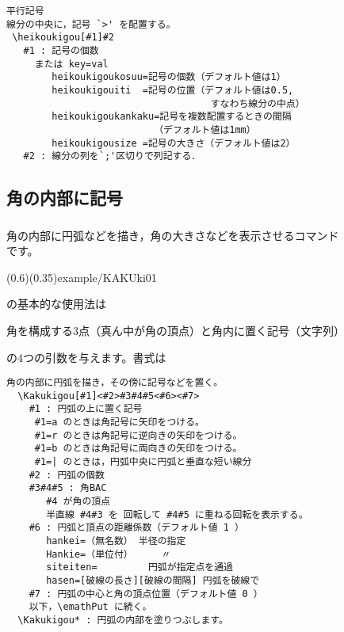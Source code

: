 \begin{boxnote}
\begin{verbatim}
平行記号
線分の中央に，記号 `>' を配置する。
 \heikoukigou[#1]#2
   #1 : 記号の個数
     または key=val
        heikoukigoukosuu=記号の個数（デフォルト値は1）
        heikoukigouiti  =記号の位置（デフォルト値は0.5, 
                                    すなわち線分の中点）
        heikoukigoukankaku=記号を複数配置するときの間隔
                          （デフォルト値は1mm）
        heikoukigousize =記号の大きさ（デフォルト値は2）
   #2 : 線分の列を`;'区切りで列記する．
\end{verbatim}
\end{boxnote}

\subsection{角の内部に記号}
\subsubsection{\texorpdfstring{}{Kakukigou}}
角の内部に円弧などを描き，角の大きさなどを表示させるコマンド\\
 です。

(0.6)(0.35){example/KAKUki01}

 の基本的な使用法は
\begin{jquote}
角を構成する3点（真ん中が角の頂点）と角内に置く記号（文字列）
\end{jquote}
の4つの引数を与えます。書式は

\begin{boxnote}
\begin{verbatim}
角の内部に円弧を描き，その傍に記号などを置く。
  \Kakukigou[#1]<#2>#3#4#5<#6><#7>
    #1 : 円弧の上に置く記号
     #1=a のときは角記号に矢印をつける。
     #1=r のときは角記号に逆向きの矢印をつける。
     #1=b のときは角記号に両向きの矢印をつける。
     #1=| のときは，円弧中央に円弧と垂直な短い線分
    #2 : 円弧の個数
    #3#4#5 : 角BAC 
       #4 が角の頂点
       半直線 #4#3 を 回転して #4#5 に重ねる回転を表示する。
    #6 : 円弧と頂点の距離係数（デフォルト値 1 ）
       hankei=（無名数） 半径の指定
       Hankie=（単位付）     〃
       siteiten=         円弧が指定点を通過
       hasen=[破線の長さ][破線の間隔] 円弧を破線で
    #7 : 円弧の中心と角の頂点位置（デフォルト値 0 ）
    以下，\emathPut に続く。
  \Kakukigou* : 円弧の内部を塗りつぶします。
\end{verbatim}
\end{boxnote}

